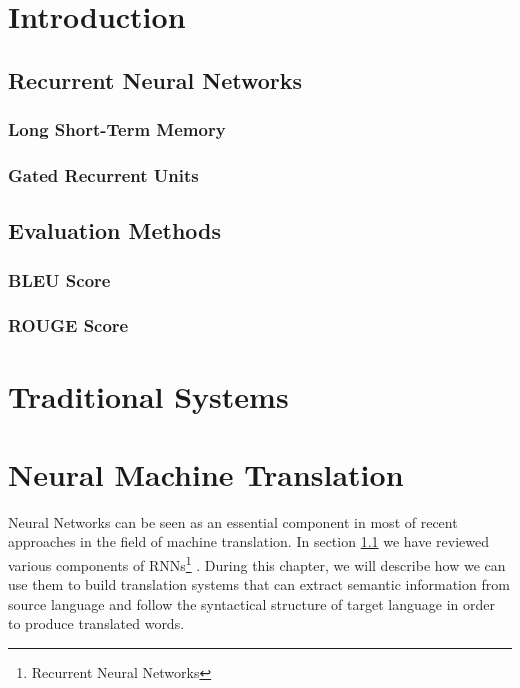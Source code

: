 \documentclass{sfuthesis}
\begin{document}
\chapter{Introduction}

\section{Recurrent Neural Networks} \label{sec:RNN}

\subsection{Long Short-Term Memory}

\subsection{Gated Recurrent Units}

\section{Evaluation Methods}
\subsection{BLEU Score}
\subsection{ROUGE Score}

\chapter{Traditional Systems}



\chapter{Neural Machine Translation}
Neural Networks can be seen as an essential component in most of recent approaches in the field of machine translation. In section \ref{sec:RNN} we have reviewed various components of RNNs\footnote{Recurrent Neural Networks} . During this chapter, we will describe how we can use them to build translation systems that can extract semantic information from source language and follow the syntactical structure of target language in order to produce translated words.
\end{document}

